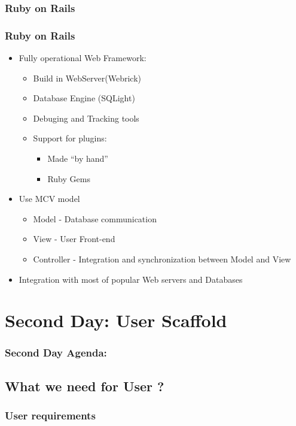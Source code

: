 \documentclass{beamer}
\begin{document}
\subsubsection{Ruby on Rails}

\begin{frame}
  \frametitle{Ruby on Rails}
  \begin{itemize}
    \item Fully operational Web Framework:
      \begin{itemize}
        \item Build in WebServer(Webrick)
        \item Database Engine (SQLight)
        \item Debuging and Tracking tools
        \item Support for plugins:
          \begin{itemize}
            \item Made ``by hand''
            \item Ruby Gems 
          \end{itemize}

      \end{itemize}
    \item Use MCV model
      \begin{itemize}
        \item Model - Database communication
        \item View - User Front-end
        \item Controller - Integration and synchronization between Model and View
      \end{itemize}
    \item Integration with most of popular Web servers and Databases

  \end{itemize}
  
\end{frame}

\section{Second Day: User Scaffold}
    \begin{frame}
      \frametitle{Second Day Agenda:}
      \tableofcontents
      [
      currentsection,
      sectionstyle=hide/hide,
      subsectionstyle=show/show/hide
      ]
    \end{frame}

  \subsection{What we need for User ?}
    \begin{frame}
      \frametitle{User requirements}
    \end{frame}
\end{document}
